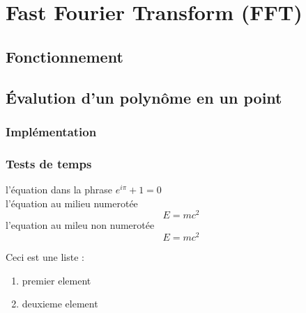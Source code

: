 \documentclass[12pt, a4paper]{report}
\begin{document}
\chapter{Fast Fourier Transform (FFT)}
\section{Fonctionnement}
\section{Évalution d'un polynôme en un point}
\subsection{Implémentation}
\subsection{Tests de temps}

l'équation dans la phrase $e^{i\pi}+1 = 0$\\
l'équation au milieu numerotée
\begin{equation}
E=mc^2
\end{equation}
l'equation au mileu non numerotée
\[ E=mc^2 \]

Ceci est une liste :
\begin{enumerate}
  \item premier element
  \item deuxieme element
\end{enumerate}
\end{document}
